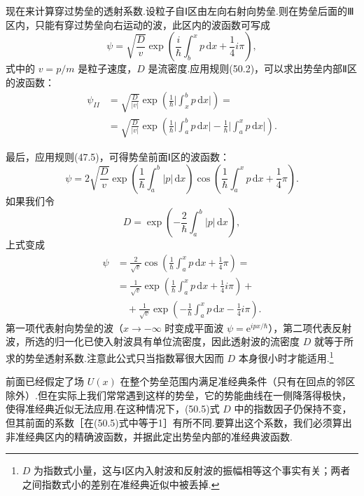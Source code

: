 现在来计算穿过势垒的透射系数.设粒子自Ⅰ区由左向右射向势垒.则在势垒后面的Ⅲ区内，只能有穿过势垒向右运动的波，此区内的波函数可写成
\begin{equation}
  \psi=\sqrt{\frac{D}{v}}\exp\left(\frac{i}{\hbar}\int_b^x p\,\mathrm{d}x+\frac{1}{4}i\pi\right),
\end{equation}
式中的 $v=p/m$ 是粒子速度，$D$ 是流密度.应用规则(50.2)，可以求出势垒内部Ⅱ区的波函数：
\begin{equation}
\begin{aligned}
  \psi_{II}&=\sqrt{\frac{D}{|v|}}\exp\left(\frac{1}{\hbar}\bigg|\int_x^b p\,\mathrm{d}x\bigg|\right)=\\
  &=\sqrt{\frac{D}{|v|}}\exp\left(\frac{1}{\hbar}\bigg|\int_a^b p\,\mathrm{d}x\bigg|
  -\frac{1}{\hbar}\bigg|\int_a^x p\,\mathrm{d}x\bigg|\right).
\end{aligned}
\end{equation}

最后，应用规则(47.5)，可得势垒前面Ⅰ区的波函数：
\begin{equation*}
  \psi=2\sqrt{\frac{D}{v}}\exp\left(\frac{1}{\hbar}\int_a^b|p|\,\mathrm{d}x\right)
  \cos\left(\frac{1}{\hbar}\int_a^x p\,\mathrm{d}x+\frac{1}{4}\pi\right).
\end{equation*}
如果我们令
\begin{equation}
  D=\exp\left(-\frac{2}{\hbar}\int_a^b|p|\,\mathrm{d}x\right),
\end{equation}
上式变成
\begin{equation*}
\begin{aligned}
  \psi&=\frac{2}{\sqrt{v}}\cos\left(\frac{1}{\hbar}\int_a^x p\,\mathrm{d}x+\frac{1}{4}\pi\right)=\\
  &=\frac{1}{\sqrt{v}}\exp\left(\frac{1}{\hbar}\int_a^x p\,\mathrm{d}x+\frac{1}{4}i\pi\right)+\\
  &\quad+\frac{1}{\sqrt{v}}\exp\left(-\frac{1}{\hbar}\int_a^x p\,\mathrm{d}x-\frac{1}{4}i\pi\right).
\end{aligned}
\end{equation*}
第一项代表射向势垒的波（$x\to-\infty$ 时变成平面波 $\psi=\mathrm{e}^{ipx/\hbar}$），第二项代表反射波，所选的归一化已使入射波具有单位流密度，因此透射波的流密度 $D$ 就等于所求的势垒透射系数.注意此公式只当指数幂很大因而 $D$ 本身很小时才能适用.\footnote{$D$ 为指数式小量，这与Ⅰ区内入射波和反射波的振幅相等这个事实有关；两者之间指数式小的差别在准经典近似中被丢掉.}

前面已经假定了场 $U(x)$ 在整个势垒范围内满足准经典条件（只有在回点的邻区除外）.但在实际上我们常常遇到这样的势垒，它的势能曲线在一侧降落得极快，使得准经典近似无法应用.在这种情况下，(50.5)式 $D$ 中的指数因子仍保持不变，但其前面的系数［在(50.5)式中等于1］有所不同.要算出这个系数，我们必须算出非准经典区内的精确波函数，并据此定出势垒内部的准经典波函数.

